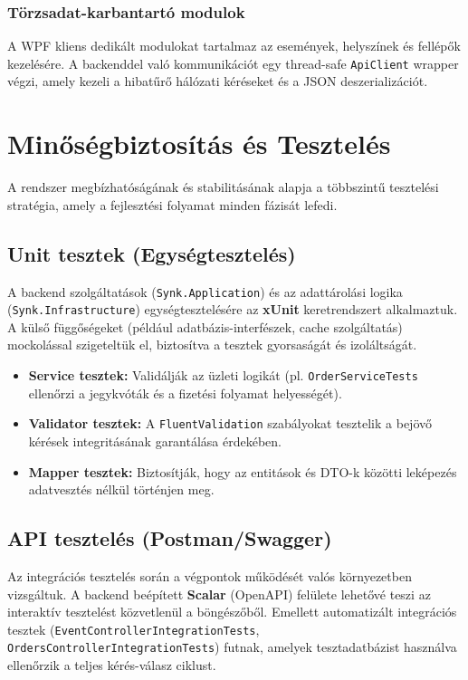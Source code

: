 \documentclass[colorlinks]{docs}
\theoremstyle{definition}
\theoremstyle{remark}
\begin{document}
\subsection{Törzsadat-karbantartó modulok}
A WPF kliens dedikált modulokat tartalmaz az események, helyszínek és fellépők kezelésére. A backenddel való kommunikációt egy thread-safe \texttt{ApiClient} wrapper végzi, amely kezeli a hibatűrő hálózati kéréseket és a JSON deszerializációt.

\chapter{Minőségbiztosítás és Tesztelés}
A rendszer megbízhatóságának és stabilitásának alapja a többszintű tesztelési stratégia, amely a fejlesztési folyamat minden fázisát lefedi.

\section{Unit tesztek (Egységtesztelés)}
A backend szolgáltatások (\texttt{Synk.Application}) és az adattárolási logika (\texttt{Synk.Infrastructure}) egységtesztelésére az \textbf{xUnit} keretrendszert alkalmaztuk. A külső függőségeket (például adatbázis-interfészek, cache szolgáltatás) mockolással szigeteltük el, biztosítva a tesztek gyorsaságát és izoláltságát.
\begin{itemize}
    \item \textbf{Service tesztek:} Validálják az üzleti logikát (pl. \texttt{OrderServiceTests} ellenőrzi a jegykvóták és a fizetési folyamat helyességét).
    \item \textbf{Validator tesztek:} A \texttt{FluentValidation} szabályokat tesztelik a bejövő kérések integritásának garantálása érdekében.
    \item \textbf{Mapper tesztek:} Biztosítják, hogy az entitások és DTO-k közötti leképezés adatvesztés nélkül történjen meg.
\end{itemize}

\section{API tesztelés (Postman/Swagger)}
Az integrációs tesztelés során a végpontok működését valós környezetben vizsgáltuk. A backend beépített \textbf{Scalar} (OpenAPI) felülete lehetővé teszi az interaktív tesztelést közvetlenül a böngészőből. Emellett automatizált integrációs tesztek (\texttt{EventControllerIntegrationTests}, \texttt{OrdersControllerIntegrationTests}) futnak, amelyek tesztadatbázist használva ellenőrzik a teljes kérés-válasz ciklust.
\end{document}

